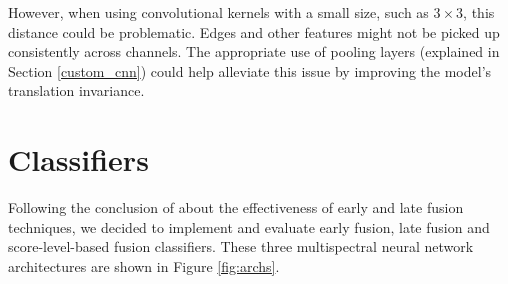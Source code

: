\documentclass{l4proj}
\begin{document}
However, when using convolutional kernels with a small size, such as $3 \times 3$, this distance could be problematic. Edges and other features might not be picked up consistently across channels. The appropriate use of pooling layers (explained in Section \ref{custom_cnn}) could help alleviate this issue by improving the model's translation invariance.


\section{Classifiers}
\label{design_classifiers}

Following the conclusion of \citet{wagner_multispectral_2016} about the effectiveness of early and late fusion techniques, we decided to implement and evaluate early fusion, late fusion and score-level-based fusion classifiers. These three multispectral neural network architectures are shown in Figure \ref{fig:archs}.
\end{document}
